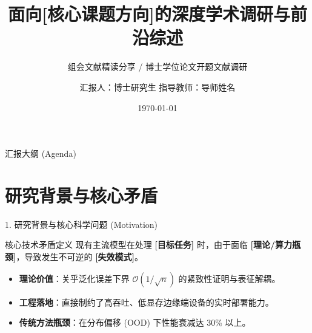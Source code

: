 \documentclass[aspectratio=169,10pt,UTF8]{ctexbeamer}
\title[博士文献汇报：前沿综述与开题切入点]{面向[核心课题方向]的深度学术调研与前沿综述}
\subtitle{组会文献精读分享 / 博士学位论文开题文献调研}
\author[汇报人]{汇报人：博士研究生 \quad 指导教师：导师姓名}
\institute[实验室名称]{所属学院 / 重点实验室 / 课题组}
\date{\today}
\begin{document}
\begin{frame}
  \titlepage
\end{frame}

\begin{frame}{汇报大纲 (Agenda)}
  \tableofcontents
\end{frame}

\section{研究背景与核心矛盾}
\begin{frame}{1. 研究背景与核心科学问题 (Motivation)}
  \begin{block}{核心技术矛盾定义}
    现有主流模型在处理 \textbf{[目标任务]} 时，由于面临 \textbf{[理论/算力瓶颈]}，导致发生不可逆的 \textbf{[失效模式]}。
  \end{block}
  \vspace{0.3cm}
  \begin{itemize}
    \item \textbf{理论价值}：关乎泛化误差下界 $\mathcal{O}(1/\sqrt{n})$ 的紧致性证明与表征解耦。
    \item \textbf{工程落地}：直接制约了高吞吐、低显存边缘端设备的实时部署能力。
    \item \textbf{传统方法瓶颈}：在分布偏移 (OOD) 下性能衰减达 30\% 以上。
  \end{itemize}
\end{frame}

\end{document}
